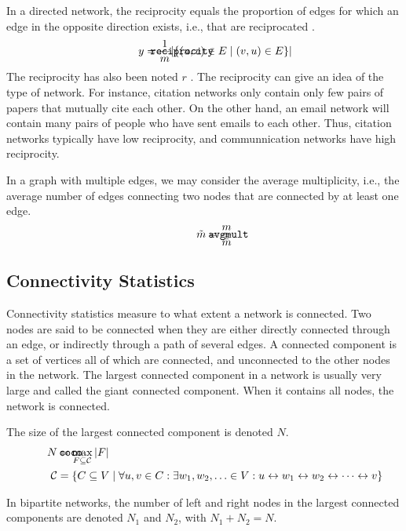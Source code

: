 \documentclass{article}
\def\mathnote#1{%
  \tag*{\rlap{\hspace\marginparsep\smash{\parbox[t]{\marginparwidth}{#1}}}}
}
\begin{document}
In a directed network, the reciprocity equals the proportion of edges
for which an edge in the opposite direction exists, i.e., that are
reciprocated \citep{b866}.  
\begin{align}
  \mathnote{\texttt{reciprocity}}
  y = \frac 1 m  | \{ (u,v) \in E \mid (v,u) \in E \} | 
\end{align}
The reciprocity has also been noted $r$ \citep[e.g.][]{b867}. 
The reciprocity can give an idea of the type of network.  For instance,
citation networks only contain only few pairs of papers that mutually
cite each other.  On the other hand, an email network will contain many
pairs of people who have sent emails to each other.  Thus, citation
networks typically have low reciprocity, and communnication networks
have high reciprocity. 

In a graph with multiple edges, we may consider the average
multiplicity, i.e., the average number of edges connecting two nodes
that are connected by at least one edge. 
\begin{align}
  \mathnote{\texttt{avgmult}}
  \tilde{m} = \frac m {\bar{\bar m}} 
\end{align}

\subsection{Connectivity Statistics}
Connectivity statistics measure to what extent a network is
connected. 
Two nodes are said to be connected when they are either directly
connected through an edge, or indirectly through a path of several
edges. 
A connected component is a set of vertices all of which are connected,
and unconnected to the other nodes in the network.  
The largest connected component in a network is usually very large and
called the giant connected component. When it contains all nodes, the
network is connected. 

The size of the largest connected component is denoted 
$N$.  
\begin{align}
  \mathnote{\texttt{coco}}
  N &= \max_{F \subseteq \mathcal C} |F|  \\
  \mathcal C &= \{ C \subseteq V \mid \forall u, v \in C:  \exists w_1,
  w_2, \ldots \in V:  u \leftrightarrow w_1 \leftrightarrow w_2 \leftrightarrow \cdots \leftrightarrow v \} \nonumber
\end{align}

In bipartite networks, the number of left and right nodes in the largest
connected components are denoted $N_1$ and $N_2$,
with $N_1 + N_2 = N$. 
\end{document}
